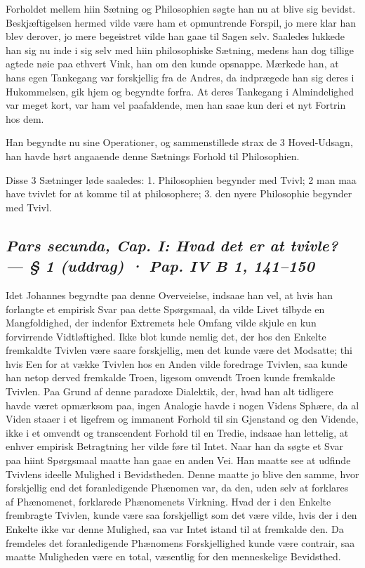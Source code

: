 \documentclass[12pt,a4paper]{article}
\newcommand{\sectionheading}[1]{\subsection*{\normalfont\itshape #1}}
\begin{document}
Forholdet mellem hiin Sætning og Philosophien søgte han nu at blive sig bevidst. Beskjæftigelsen hermed vilde være ham et opmuntrende Forspil, jo mere klar han blev derover, jo mere begeistret vilde han gaae til Sagen selv. Saaledes lukkede han sig nu inde i sig selv med hiin philosophiske Sætning, medens han dog tillige agtede nøie paa ethvert Vink, han om den kunde opsnappe. Mærkede han, at hans egen Tankegang var forskjellig fra de Andres, da indprægede han sig deres i Hukommelsen, gik hjem og begyndte forfra. At deres Tankegang i Almindelighed var meget kort, var ham vel paafaldende, men han saae kun deri et nyt Fortrin hos dem.

Han begyndte nu sine Operationer, og sammenstillede strax de 3 Hoved-Udsagn, han havde hørt angaaende denne Sætnings Forhold til Philosophien.

Disse 3 Sætninger løde saaledes: 1. Philosophien begynder med Tvivl; 2 man maa have tvivlet for at komme til at philosophere; 3. den nyere Philosophie begynder med Tvivl.

\sectionheading{Pars secunda, Cap. I: Hvad det er at tvivle? — § 1 (uddrag)  ·  Pap. IV B 1, 141–150}

Idet Johannes begyndte paa denne Overveielse, indsaae han vel, at hvis han forlangte et empirisk Svar paa dette Spørgsmaal, da vilde Livet tilbyde en Mangfoldighed, der indenfor Extremets hele Omfang vilde skjule en kun forvirrende Vidtløftighed. Ikke blot kunde nemlig det, der hos den Enkelte fremkaldte Tvivlen være saare forskjellig, men det kunde være det Modsatte; thi hvis Een for at vække Tvivlen hos en Anden vilde foredrage Tvivlen, saa kunde han netop derved fremkalde Troen, ligesom omvendt Troen kunde fremkalde Tvivlen. Paa Grund af denne paradoxe Dialektik, der, hvad han alt tidligere havde været opmærksom paa, ingen Analogie havde i nogen Videns Sphære, da al Viden staaer i et ligefrem og immanent Forhold til sin Gjenstand og den Vidende, ikke i et omvendt og transcendent Forhold til en Tredie, indsaae han lettelig, at enhver empirisk Betragtning her vilde føre til Intet. Naar han da søgte et Svar paa hiint Spørgsmaal maatte han gaae en anden Vei. Han maatte see at udfinde Tvivlens ideelle Mulighed i Bevidstheden. Denne maatte jo blive den samme, hvor forskjellig end det foranledigende Phænomen var, da den, uden selv at forklares af Phænomenet, forklarede Phænomenets Virkning. Hvad der i den Enkelte frembragte Tvivlen, kunde være saa forskjelligt som det være vilde, hvis der i den Enkelte ikke var denne Mulighed, saa var Intet istand til at fremkalde den. Da fremdeles det foranledigende Phænomens Forskjellighed kunde være contrair, saa maatte Muligheden være en total, væsentlig for den menneskelige Bevidsthed.
\end{document}
